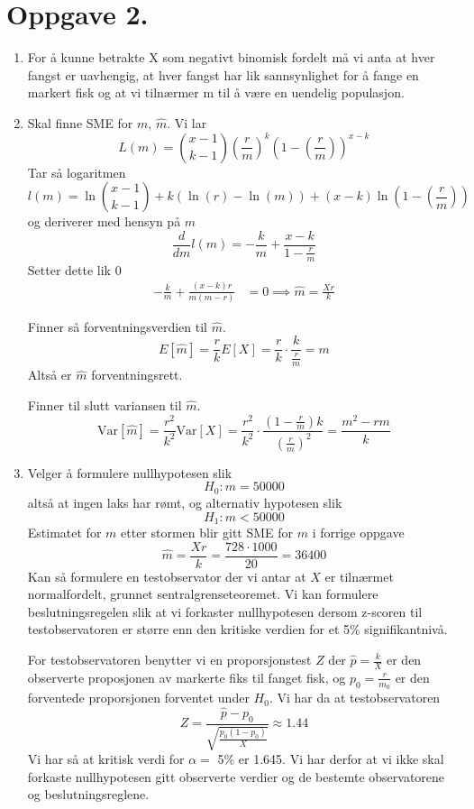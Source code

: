 \documentclass[a4paper,11pt,norsk]{article}
\begin{document}
\section*{Oppgave 2.}
\begin{enumerate}
    \item For å kunne betrakte X som negativt binomisk fordelt må vi anta
        at hver fangst er uavhengig, at hver fangst har lik sannsynlighet for å
        fange en markert fisk og at vi tilnærmer m til å være en uendelig populasjon.
    \item Skal finne SME for $m$, $\hat{m}$. Vi lar 
        \[
            L(m) = \binom{x-1}{k-1}\left(\frac{r}{m}\right)^k \left(1 - \left(\frac{r}{m}\right)\right)^{x-k}
        \]
        Tar så logaritmen
        \[
            l(m) = \ln{\binom{x-1}{k-1}} + k(\ln{(r)} - \ln{(m)}) + (x - k)\ln{\left(1 - \left(\frac{r}{m}\right)\right)}
        \]
        og deriverer med hensyn på $m$
        \[
            \frac{d}{dm}l(m) = -\frac{k}{m} + \frac{x - k}{1 - \frac{r}{m}}
        \]
        Setter dette lik 0
        \begin{align*}
            -\frac{k}{m} + \frac{(x - k)r}{m(m-r)} &= 0 \implies 
            \hat{m} = \frac{Xr}{k}
        \end{align*}

        Finner så forventningsverdien til $\hat{m}$.
        \[
            E[\hat{m}] = \frac{r}{k} E[X] = \frac{r}{k} \cdot \frac{k}{\frac{r}{m}} = m
        \]
        Altså er $\hat{m}$ forventningsrett.
        
        Finner til slutt variansen til $\hat{m}$.
        \[
            \text{Var}[\hat{m}] = \frac{r^2}{k^2} \text{Var}[X] = \frac{r^2}{k^2} \cdot \frac{\left(1 - \frac{r}{m}\right)k}{\left(\frac{r}{m}\right)^2} = \frac{m^2 - rm}{k}
        \]
    \item Velger å formulere nullhypotesen slik
        \[
            H_0: m = 50000
        \]
        altså at ingen laks har rømt, og alternativ hypotesen slik
        \[
            H_1: m < 50000
        \]
        Estimatet for $m$ etter stormen blir gitt SME for $m$ i forrige oppgave 
        \[
            \hat{m} = \frac{Xr}{k} = \frac{728 \cdot 1000}{20} = 36400
        \]
        Kan så formulere en testobservator der vi antar at $X$ er tilnærmet 
        normalfordelt, grunnet sentralgrenseteoremet. Vi kan formulere 
        beslutningsregelen slik at vi forkaster nullhypotesen dersom 
        z-scoren til testobservatoren er større enn den kritiske verdien 
        for et 5\% signifikantnivå.

        For testobservatoren benytter vi en proporsjonstest
        $Z$ der $\hat{p} = \frac{k}{X}$ er den observerte proposjonen av markerte fiks til 
        fanget fisk, og $p_0 = \frac{r}{m_0}$ er den forventede proporsjonen forventet under 
        $H_0$. Vi har da at testobservatoren
        \[
            Z = \frac{\hat{p} - p_0}{\sqrt{\frac{p_0(1 - p_0)}{X}}} \approx 1.44
        \]
        Vi har så at kritisk verdi for $\alpha =$ 5\% er 1.645. Vi har derfor 
        at vi ikke skal forkaste nullhypotesen gitt observerte verdier og de bestemte 
        observatorene og beslutningsreglene.
\end{enumerate}
\end{document}
